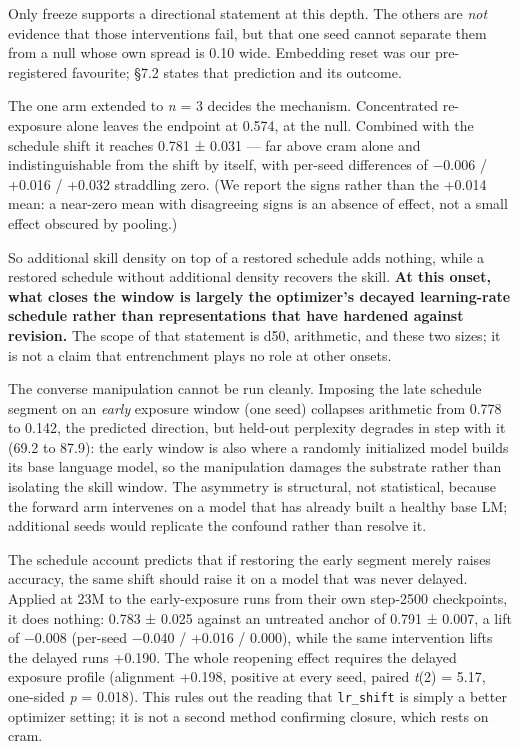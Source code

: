 \documentclass[11pt]{article}
\begin{document}
Only freeze supports a directional statement at this depth. The others are \emph{not} evidence
that those interventions fail, but that one seed cannot separate them from a null whose own
spread is 0.10 wide. Embedding reset was our pre-registered favourite; §7.2 states that
prediction and its outcome.

The one arm extended to \emph{n} = 3 decides the mechanism. Concentrated re-exposure alone leaves
the endpoint at 0.574, at the null. Combined with the schedule shift it reaches
0.781 ± 0.031 — far above cram alone and indistinguishable from the shift by itself, with
per-seed differences of −0.006 / +0.016 / +0.032 straddling zero. (We report the signs
rather than the +0.014 mean: a near-zero mean with disagreeing signs is an absence of
effect, not a small effect obscured by pooling.)

So additional skill density on top of a restored schedule adds nothing, while a restored
schedule without additional density recovers the skill. \textbf{At this onset, what closes the
window is largely the optimizer's decayed learning-rate schedule rather than representations
that have hardened against revision.} The scope of that statement is d50, arithmetic, and
these two sizes; it is not a claim that entrenchment plays no role at other onsets.

The converse manipulation cannot be run cleanly. Imposing the late schedule segment on an
\emph{early} exposure window (one seed) collapses arithmetic from 0.778 to 0.142, the predicted
direction, but held-out perplexity degrades in step with it (69.2 to 87.9): the early window is
also where a randomly initialized model builds its base language model, so the manipulation
damages the substrate rather than isolating the skill window. The asymmetry is structural, not
statistical, because the forward arm intervenes on a model that has already built a healthy base
LM; additional seeds would replicate the confound rather than resolve it.


The schedule account predicts that if restoring the early segment merely raises accuracy, the
same shift should raise it on a model that was never delayed. Applied at 23M to the
early-exposure runs from their own step-2500 checkpoints, it does nothing: 0.783 ± 0.025
against an untreated anchor of 0.791 ± 0.007, a lift of −0.008 (per-seed −0.040 / +0.016 /
0.000), while the same intervention lifts the delayed runs +0.190. The whole reopening effect
requires the delayed exposure profile (alignment +0.198, positive at every seed, paired
\emph{t}(2) = 5.17, one-sided \emph{p} = 0.018). This rules out the reading that \texttt{lr\_shift} is simply a
better optimizer setting; it is not a second method confirming closure, which rests on cram.
\end{document}
